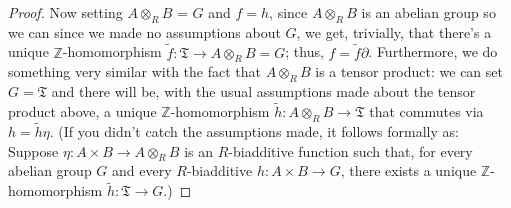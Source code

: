 \documentclass[12pt,reqno]{amsart}
\theoremstyle{plain}
\newcommand{\zz}{\mathbb Z}
\begin{document}
\begin{proof}
Now setting $ A \otimes_R B$ = $G$ and $f = h$, since $A \otimes_R B$ is an abelian group so we can since we made no assumptions about $G$, we get, trivially, that there's a unique $\zz$-homomorphism $\tilde{f} \colon \mathfrak{T} \to A \otimes_R B = G$; thus, $ f = \tilde{f} \partial$.  Furthermore, we do something very similar with the fact that $A \otimes_R B$ is a tensor product: we can set $G = \mathfrak{T}$ and there will be, with the usual assumptions made about the tensor product above,  a unique $\zz$-homomorphism $\tilde{h} \colon A \otimes_R B \to \mathfrak{T}$ that commutes via $h = \tilde{h} \eta$.  (If you didn't catch the assumptions made, it follows formally as: Suppose $\eta \colon A \times B \to A \otimes_R B $ is an $R$-biadditive function such that, for every abelian group $G$ and every $R$-biadditive $h \colon A \times B \to G$, there exists a unique $\zz$-homomorphism $\tilde{h} \colon \mathfrak{T} \to G$.) 


\end{proof}
\end{document}
